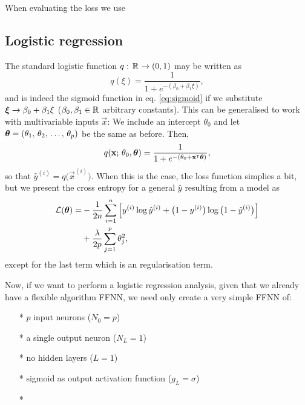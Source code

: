     When evaluating the loss we use  

\subsection{Logistic regression}\label{sec:logistic_regression}

The standard logistic function $q:\, \mathbb{R}^{} \to (0,1)$ may be written as 
\begin{equation}\label{eq:logistic_function}
    q(\xi) = \frac{1}{1+e^{-(\beta_0 + \beta_1\xi)}},
\end{equation}
and is indeed the sigmoid function in eq. \eqref{eq:sigmoid} if we substitute $\boldsymbol{\xi} \to \beta_0 + \beta_1 \xi$ ($\beta_0, \beta_1 \in \mathbb{R}^{}$ arbitrary constants). This can be generalised to work with multivariable inputs $\vec{x}$: We include an intercept $\theta_0$ and let $\boldsymbol{\theta} = (\theta_1, \, \theta_2, \, \dots,\, \theta_p)$ be the same as before. Then,
\begin{equation}\label{eq:logistic_function_fit}
    q(\mathbf{x};\,\theta_0, \boldsymbol{\theta}) = \frac{1}{1+e^{-(\theta_0 + \mathbf{x}^\intercal \boldsymbol{\theta})}},
\end{equation}
so that $\hat{y}^{(i)} = q\big(\vec{x}^{(i)}\big)$. When this is the case, the loss function simplies a bit, but we present the cross entropy for a general $\hat{y}$ resulting from a model as
\begin{equation}\label{eq:logistic_regression_cost_function}
    \begin{split}
        \mathcal{L}(\boldsymbol{\theta}) =& -  \frac{1}{2n}\sum_{i=1}^n \Big[ y^{(i)} \log{\hat{y}^{(i)}} + \big(1-y^{(i)}\big) \log{\big(1-\hat{y}^{(i)}\big)}\Big] \\
        &+ \frac{\lambda}{2p}\sum_{j=1}^p \theta_j^2,
    \end{split}
\end{equation}
except for the last term which is an \lnorm[2] regularisation term.

Now, if we want to perform a logistic regression analysis, given that we already have a flexible algorithm FFNN, we need only create a very simple FFNN of: 
\begin{enumerate}
    \item[*] $p$ input neurons ($N_0=p$)
    \item[*] a single output neuron ($N_L=1$)
    \item[*] no hidden layers ($L=1$)
    \item[*] sigmoid as output activation function ($g_L=\sigma$)
    \item[*]  
\end{enumerate}



